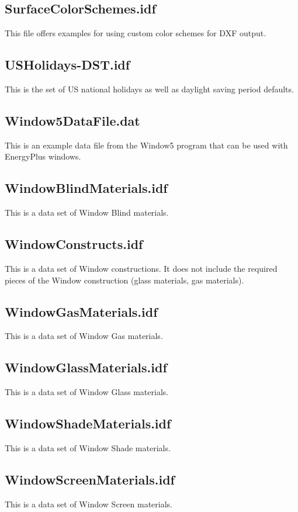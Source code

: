 \subsection{SurfaceColorSchemes.idf}\label{surfacecolorschemes.idf}

This file offers examples for using custom color schemes for DXF output.

\subsection{USHolidays-DST.idf}\label{usholidays-dst.idf}

This is the set of US national holidays as well as daylight saving period defaults.

\subsection{Window5DataFile.dat}\label{window5datafile.dat}

This is an example data file from the Window5 program that can be used with EnergyPlus windows.

\subsection{WindowBlindMaterials.idf}\label{windowblindmaterials.idf}

This is a data set of Window Blind materials.

\subsection{WindowConstructs.idf}\label{windowconstructs.idf}

This is a data set of Window constructions. It does not include the required pieces of the Window construction (glass materials, gas materials).

\subsection{WindowGasMaterials.idf}\label{windowgasmaterials.idf}

This is a data set of Window Gas materials.

\subsection{WindowGlassMaterials.idf}\label{windowglassmaterials.idf}

This is a data set of Window Glass materials.

\subsection{WindowShadeMaterials.idf}\label{windowshadematerials.idf}

This is a data set of Window Shade materials.

\subsection{WindowScreenMaterials.idf}\label{windowscreenmaterials.idf}

This is a data set of Window Screen materials.
